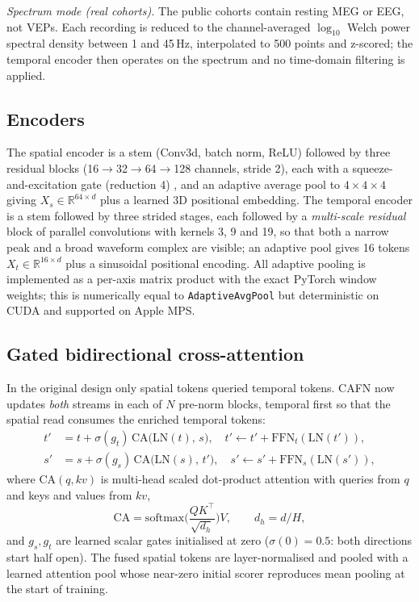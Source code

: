 \emph{Spectrum mode (real cohorts).} The public cohorts contain resting MEG or EEG, not VEPs. Each recording is reduced to the channel-averaged $\log_{10}$ Welch power spectral density between 1 and 45\,Hz, interpolated to 500 points and z-scored; the temporal encoder then operates on the spectrum and no time-domain filtering is applied.

\subsection{Encoders}
The spatial encoder is a stem (Conv3d, batch norm, ReLU) followed by three residual blocks (16$\to$32$\to$64$\to$128 channels, stride 2), each with a squeeze-and-excitation gate (reduction 4) \cite{hu2018}, and an adaptive average pool to $4\times4\times4$ giving $X_s\in\mathbb{R}^{64\times d}$ plus a learned 3D positional embedding. The temporal encoder is a stem followed by three strided stages, each followed by a \emph{multi-scale residual} block of parallel convolutions with kernels 3, 9 and 19, so that both a narrow peak and a broad waveform complex are visible; an adaptive pool gives 16 tokens $X_t\in\mathbb{R}^{16\times d}$ plus a sinusoidal positional encoding. All adaptive pooling is implemented as a per-axis matrix product with the exact PyTorch window weights; this is numerically equal to \texttt{AdaptiveAvgPool} but deterministic on CUDA and supported on Apple MPS.

\subsection{Gated bidirectional cross-attention}
In the original design only spatial tokens queried temporal tokens. CAFN now updates \emph{both} streams in each of $N$ pre-norm blocks, temporal first so that the spatial read consumes the enriched temporal tokens:
\begin{align}
t' &= t + \sigma(g_t)\,\mathrm{CA}\big(\mathrm{LN}(t),\,s\big),\quad t'\leftarrow t'+\mathrm{FFN}_t(\mathrm{LN}(t')),\\
s' &= s + \sigma(g_s)\,\mathrm{CA}\big(\mathrm{LN}(s),\,t'\big),\quad s'\leftarrow s'+\mathrm{FFN}_s(\mathrm{LN}(s')),
\end{align}
where $\mathrm{CA}(q,kv)$ is multi-head scaled dot-product attention with queries from $q$ and keys and values from $kv$,
\begin{equation}
\mathrm{CA}=\mathrm{softmax}\!\Big(\frac{QK^{\top}}{\sqrt{d_h}}\Big)V,\qquad d_h=d/H,
\end{equation}
and $g_s,g_t$ are learned scalar gates initialised at zero ($\sigma(0)=0.5$: both directions start half open). The fused spatial tokens are layer-normalised and pooled with a learned attention pool whose near-zero initial scorer reproduces mean pooling at the start of training.

